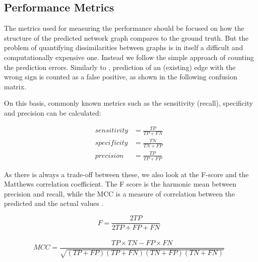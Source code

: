 \subsection{Performance Metrics}
The metrics used for measuring the performance should be focused on how the structure of the predicted network graph compares to the ground truth.
But the problem of quantifying dissimilarities between graphs is in itself a difficult and computationally expensive one.
Instead we follow the simple approach of counting the prediction errors.
Similarly to \cite{kaufmann_bayesian_2015}, prediction of an (existing) edge with the wrong sign is counted as a false positive, as shown in the following confusion matrix.
\begin{table}[H]
	\centering
\end{table}
On this basis, commonly known metrics such as the sensitivity (recall), specificity and precision can be calculated:

\begin{align*}
	sensitivity & = \frac{TP}{TP+FN} \\
	specificity & = \frac{TN}{TN+FP} \\
	precision   & = \frac{TP}{TP+FP} 
\end{align*}

As there is always a trade-off between these, we also look at the F-score and the Matthews correlation coefficient.
The F score is the harmonic mean between precision and recall, while the MCC is a measure of correlation between the predicted and the actual values \citep{baldi2000assessing}.

\[
	F = \frac{2TP}{2TP + FP + FN}
\]\\
\[
	MCC = \frac{TP \times TN - FP \times FN}{\sqrt{(TP + FP) (TP + FN) (TN+FP) (TN+FN)}}
\]

